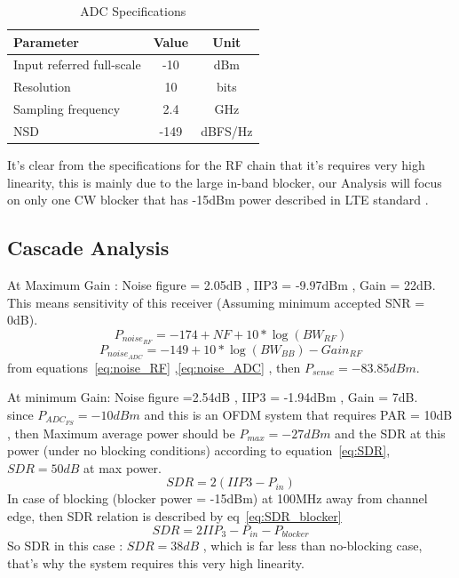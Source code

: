 \begin{table}[htbp]
    \centering
    \label{tab:original_ADC_specs}
    \caption{ADC Specifications}
    \begin{tabular}{l c c} 
        \toprule
        \textbf{Parameter} & \textbf{Value} & \textbf{Unit} \\
        \midrule
        Input referred full-scale & -10 & dBm \\
        Resolution & 10 & bits \\ 
        Sampling frequency & 2.4 & GHz \\
        NSD & -149 & dBFS/Hz \\
        \bottomrule
    \end{tabular}
\end{table}

It's clear from the specifications for the RF chain that it's 
requires very high linearity, this is mainly due to the large 
in-band blocker, our Analysis will focus on only one CW blocker
that has -15dBm power described in LTE standard \cite{3gpp_ts36104_blocking}.

\subsection{Cascade Analysis}%
At Maximum Gain : Noise figure = 2.05dB , IIP3 = -9.97dBm , 
Gain = 22dB.\\
This means sensitivity of this receiver (Assuming minimum 
accepted SNR = 0dB).
\begin{equation}
    P_{noise_{RF}} = -174 + NF  + 10*\log(BW_{RF})
    \label{eq:noise_RF}
\end{equation}
\begin{equation}
    P_{noise_{ADC}}  = -149 + 10*\log(BW_{BB}) - Gain_{RF}
    \label{eq:noise_ADC}
\end{equation}
from equations~\ref{eq:noise_RF} ,\ref{eq:noise_ADC} , then 
$P_{sense} = -83.85 dBm$.

At minimum Gain: Noise figure =2.54dB , IIP3 = -1.94dBm ,
Gain = 7dB.\\
since
$P_{ADC_{FS}} = -10 dBm$ and this is an OFDM system that requires
PAR = 10dB , then Maximum average power should be $P_{max} = -27 
dBm$ and the SDR at this power (under no blocking conditions) 
according to equation~\ref{eq:SDR}, $SDR = 50dB$ at max power.\\
\begin{equation}
    SDR = 2(IIP3-P_{in})
    \label{eq:SDR}
\end{equation}
In case of blocking (blocker power = -15dBm) at 100MHz away from
channel edge, then SDR relation is described by 
eq~\ref{eq:SDR_blocker}
\begin{equation}
    SDR  = 2 IIP_3 - P_{in} - P_{blocker}
    \label{eq:SDR_blocker}
\end{equation}
So SDR in this case : $SDR = 38dB$ , which is far less than 
no-blocking case, that's why the system requires this very high
linearity.

